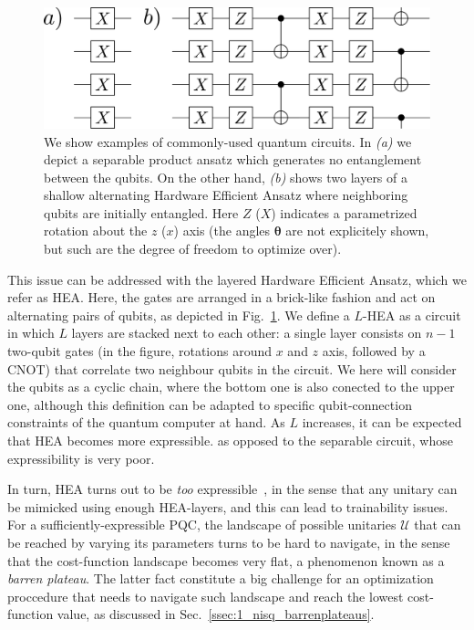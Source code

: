 \begin{figure}[t!]
    \centering
    \includegraphics[width=1.\textwidth]{Figures/VANS/Fig2.pdf}
    \caption{We show examples of commonly-used quantum circuits. In \textit{(a)} we depict a separable product ansatz which generates no entanglement between the qubits. On the other hand, \textit{(b)} shows two layers of a shallow alternating Hardware Efficient Ansatz where neighboring  qubits are initially entangled.  Here $Z$ ($X$) indicates a parametrized rotation about the $z$ ($x$) axis (the angles $\bm{\theta}$ are not explicitely shown, but such are the degree of freedom to optimize over).}
    \label{fig:FANSATZ}
\end{figure}

This issue can be addressed with the layered Hardware Efficient Ansatz\cite{kandala2017hardware}, which we refer as HEA. Here, the gates are arranged in a brick-like fashion and act on alternating pairs of qubits, as depicted in Fig.~\ref{fig:FANSATZ}. We define a $L$-HEA as a circuit in which $L$ layers are stacked next to each other: a single layer consists on $n-1$ two-qubit gates (in the figure, rotations around $x$ and $z$ axis, followed by a CNOT) that correlate two neighbour qubits in the circuit. We here will consider the qubits as a cyclic chain, where the bottom one is also conected to the upper one, although this definition can be adapted to specific qubit-connection constraints of the quantum computer at hand. As $L$ increases, it can be expected that HEA becomes more expressible. as opposed to the separable circuit, whose expressibility is very poor.

In turn, HEA turns out to be \textit{too} expressible~\cite{holmes2021connecting}, in the sense that any unitary can be mimicked using enough HEA-layers, and this can lead to trainability issues. For a sufficiently-expressible PQC, the landscape of possible unitaries $\mathcal{U}$ that can be reached by varying its parameters turns to be hard to navigate, in the sense that the cost-function landscape becomes very flat, a phenomenon known as a \textit{barren plateau}. The latter fact constitute a big challenge for an optimization proccedure that needs to navigate such landscape and reach the lowest cost-function value, as discussed in Sec.~\ref{ssec:1_nisq_barrenplateaus}.

